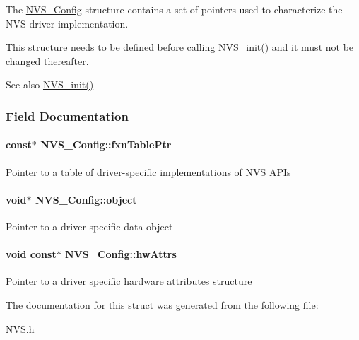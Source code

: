 The \hyperlink{struct_n_v_s___config}{N\+V\+S\+\_\+\+Config} structure contains a set of pointers used to characterize the N\+V\+S driver implementation.

This structure needs to be defined before calling \hyperlink{_n_v_s_8h_a94e249f718eba502cdf34d098c83209e}{N\+V\+S\+\_\+init()} and it must not be changed thereafter.

\begin{DoxySeeAlso}{See also}
\hyperlink{_n_v_s_8h_a94e249f718eba502cdf34d098c83209e}{N\+V\+S\+\_\+init()} 
\end{DoxySeeAlso}


\subsubsection{Field Documentation}
\paragraph[{fxn\+Table\+Ptr}]{ const$\ast$ N\+V\+S\+\_\+\+Config\+::fxn\+Table\+Ptr}\label{struct_n_v_s___config_aa1ed9a9c3ec0a1f3c9a5fac057c55670}
Pointer to a table of driver-\/specific implementations of N\+V\+S A\+P\+Is 
\paragraph[{object}]{\setlength{\rightskip}{0pt plus 5cm}void$\ast$ N\+V\+S\+\_\+\+Config\+::object}\label{struct_n_v_s___config_a04d08bd3139ba6a6f51ccde721023b59}
Pointer to a driver specific data object 
\paragraph[{hw\+Attrs}]{\setlength{\rightskip}{0pt plus 5cm}void const$\ast$ N\+V\+S\+\_\+\+Config\+::hw\+Attrs}\label{struct_n_v_s___config_a96723351986b33e91fc9229d3bf517f1}
Pointer to a driver specific hardware attributes structure 

The documentation for this struct was generated from the following file\+:\begin{DoxyCompactItemize}
\item 
\hyperlink{_n_v_s_8h}{N\+V\+S.\+h}\end{DoxyCompactItemize}
